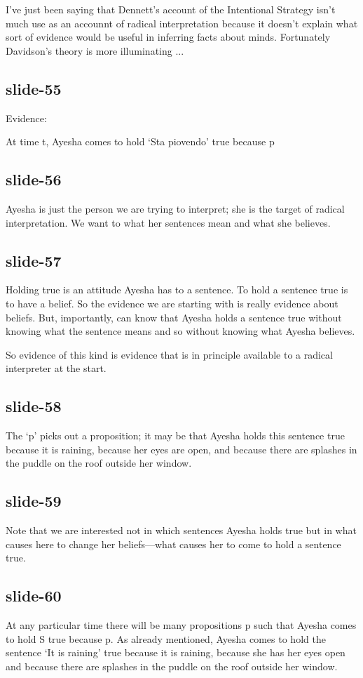 \documentclass[12pt,\papersize]{extarticle}
\begin{document}
I’ve just been saying that Dennett’s account of the Intentional Strategy
isn’t much use as an accounnt of radical interpretation because it doesn’t
explain what sort of evidence would be useful in inferring facts about
minds.
Fortunately Davidson’s theory is more illuminating ...

\subsection{slide-55}
Evidence:

At time t,   Ayesha comes to hold ‘Sta piovendo’ true because  p


\subsection{slide-56}
Ayesha is just the person we are trying to interpret;
she is the target of radical interpretation.
We want to what her sentences mean and what she believes.

\subsection{slide-57}
Holding true is an attitude Ayesha has to a sentence.
To hold a sentence true is to have a belief.
So the evidence we are starting with is really evidence about beliefs.
But, importantly, can know that Ayesha holds a sentence true
without knowing what the sentence means and so without knowing
what Ayesha believes.

So evidence of this kind is evidence that is in principle available to a radical
interpreter at the start.

\subsection{slide-58}
The ‘p’ picks out a proposition; it may be that Ayesha holds this
sentence true because it is raining, because her eyes are open,
and because there are splashes in the puddle on the roof outside her window.

\subsection{slide-59}
Note that we are interested not in which sentences Ayesha holds true
but in what causes here to change her beliefs---what causes her to
come to hold a sentence true.

\subsection{slide-60}
At any particular time there will be many
propositions p such that Ayesha comes to hold S true because p.
As already mentioned, Ayesha comes to hold the sentence ‘It is raining’
true because it is raining, because she has her eyes open
and because there are splashes in the puddle on the roof outside her window.
\end{document}
